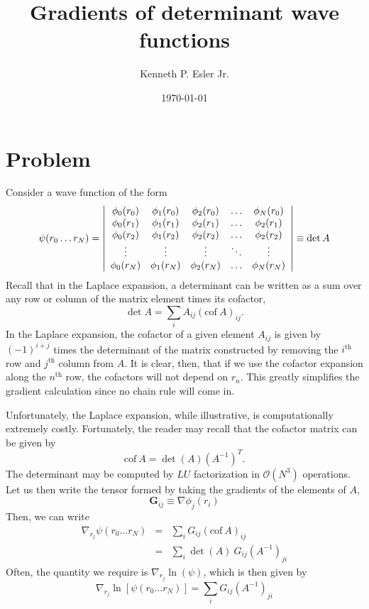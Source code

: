 \documentclass{article}
\title{Gradients of determinant wave functions}
\author{Kenneth P. Esler Jr.}
\date{\today}
\newenvironment{DMatrix}{\begin{array}|{*{20}{c}}|}{\end{array}}
\begin{document}
\maketitle

\section{Problem}
Consider a wave function of the form
\begin{equation}
  \psi(r_0  \dots r_N) = 
\begin{DMatrix}
\phi_0(r_0) & \phi_1(r_0) & \phi_2(r_0) & \dots  & \phi_N(r_0) \\
\phi_0(r_1) & \phi_1(r_1) & \phi_2(r_1) & \dots  & \phi_2(r_1) \\
\phi_0(r_2) & \phi_1(r_2) & \phi_2(r_2) & \dots  & \phi_2(r_2) \\
\vdots      & \vdots      & \vdots      & \ddots &  \vdots     \\
\phi_0(r_N) & \phi_1(r_N) & \phi_2(r_N) & \dots  & \phi_N(r_N)
\end{DMatrix}
\equiv \det A
\end{equation}
Recall that in the Laplace expansion, a determinant can be written as
a sum over any row or column of the matrix element times its cofactor,
\begin{equation}
\det A = \sum_i A_{ij} (\text{cof}\ A)_{ij}.
\end{equation}
In the Laplace expansion, the cofactor of a given element $A_{ij}$ is
given by $(-1)^{i+j}$ times the determinant of the matrix constructed
by removing the $i^\text{th}$ row and $j^\text{th}$ column from $A$.
It is clear, then, that if we use the cofactor expansion along the
$n^\text{th}$ row, the cofactors will not depend on $r_n$.  This
greatly simplifies the gradient calculation since no chain rule will
come in.  

Unfortunately, the Laplace expansion, while illustrative, is
computationally extremely costly.  Fortunately, the reader may 
recall that the cofactor matrix can be given by
\begin{equation}
\text{cof}\ A = \det(A) \left(A^{-1}\right)^T.
\end{equation}
The determinant may be computed by $LU$ factorization in
$\mathcal{O}(N^3)$ operations.  Let us then write the tensor
formed by taking the gradients of the elements of $A$,
\begin{equation}
\mathbf{G}_{ij} \equiv \nabla \phi_j (r_i)
\end{equation}
Then, we can write
\begin{eqnarray}
\nabla_{r_j} \psi(r_0 \dots r_N) & = &
\sum_i G_{ij} (\text{cof}\  A)_{ij} \\
& = & \sum_i \det(A) \ G_{ij} \left( A^{-1}\right)_{ji}
\end{eqnarray}
Often, the quantity we require is $\nabla_{r_j} \ln(\psi)$, which is
then given by
\begin{equation}
\nabla_{r_j} \ln\left[\psi(r_0 \dots r_N)\right] =
\sum_i G_{ij} \left( A^{-1}\right)_{ji}
\end{equation}
\end{document}

